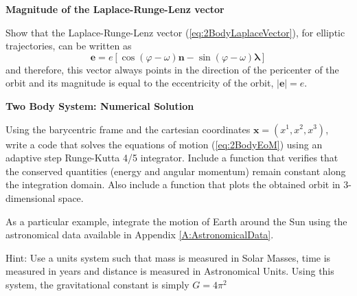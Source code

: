 \begin{exercise}
\textbf{Magnitude of the Laplace-Runge-Lenz vector}

Show that the Laplace-Runge-Lenz vector (\ref{eq:2BodyLaplaceVector}), for elliptic trajectories, can be written as
\begin{equation}
\textbf{e} = e \left[ \cos (\varphi - \omega) \textbf{n} - \sin (\varphi - \omega) \boldsymbol{\lambda} \right] \label{eq:2BodyLaplaceVector2}
\end{equation}
and therefore, this vector always points in the direction of the pericenter of the orbit and its magnitude is equal to the eccentricity of the orbit, $\left| \textbf{e} \right| = e$.
\end{exercise}

\begin{exercise}
 \textbf{Two Body System: Numerical Solution}
 
 Using the barycentric frame and the cartesian coordinates $\textbf{x} = (x^1, x^2, x^3)$, write a code that solves the equations of motion (\ref{eq:2BodyEoM}) using an adaptive step Runge-Kutta 4/5 integrator. Include a function that verifies that the conserved quantities (energy and angular momentum) remain constant along the integration domain. Also include a function that plots the obtained orbit in 3-dimensional space.

 As a particular example, integrate the motion of Earth around the Sun using the astronomical data available in Appendix \ref{A:AstronomicalData}.

Hint: Use a units system such that mass is measured in Solar Masses, time is measured in years and distance is measured in Astronomical Units. Using this system, the gravitational constant is simply $G=4\pi^2$
\end{exercise}





